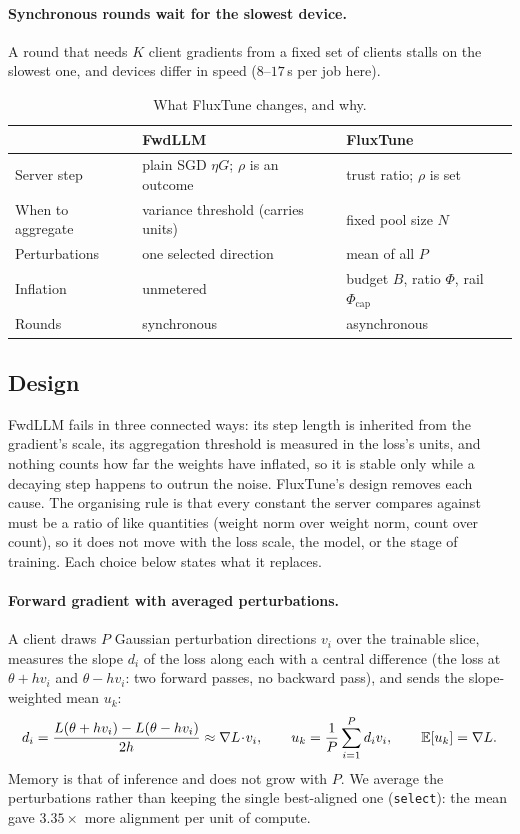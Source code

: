 \paragraph{Synchronous rounds wait for the slowest device.}
A round that needs $K$ client gradients from a fixed set of clients stalls on the slowest one, and devices differ in speed ($8$--$17$\,s per job here).

\begin{table}[t]
\centering
\caption{What FluxTune changes, and why.}
\label{tab:ft:changes}
\small
\begin{tabular}{@{}p{2.1cm}p{2.6cm}p{2.6cm}@{}}
\toprule
 & FwdLLM & FluxTune \\
\midrule
Server step & plain SGD $\eta G$; $\rho$ is an outcome & trust ratio; $\rho$ is set \\
When to aggregate & variance threshold (carries units) & fixed pool size $N$ \\
Perturbations & one selected direction & mean of all $P$ \\
Inflation & unmetered & budget $B$, ratio $\Phi$, rail $\Phi_{\mathrm{cap}}$ \\
Rounds & synchronous & asynchronous \\
\bottomrule
\end{tabular}
\end{table}

\subsection{Design}
\label{sec:ft:design}
FwdLLM fails in three connected ways: its step length is inherited from the gradient's scale, its aggregation threshold is measured in the loss's units, and nothing counts how far the weights have inflated,
so it is stable only while a decaying step happens to outrun the noise. FluxTune's design removes each cause. The organising rule is that every constant the server compares against must be a ratio of like quantities
(weight norm over weight norm, count over count), so it does not move with the loss scale, the model, or the stage of training. Each choice below states what it replaces.

\paragraph{Forward gradient with averaged perturbations.}\label{sec:ft:fg}
A client draws $P$ Gaussian perturbation directions $v_i$ over the trainable slice, measures the slope $d_i$ of the loss along each with a central difference (the loss at $\theta+hv_i$ and $\theta-hv_i$: two forward passes, no backward pass),
and sends the slope-weighted mean $u_k$:
\begin{equation}
d_i=\frac{L(\theta+hv_i)-L(\theta-hv_i)}{2h}\approx\nabla L\!\cdot\! v_i,\qquad
u_k=\frac1P\sum_{i=1}^{P}d_iv_i,\qquad\mathbb{E}[u_k]=\nabla L .
\label{eq:ft:fg}
\end{equation}
Memory is that of inference and does not grow with $P$. We average the perturbations rather than keeping the single best-aligned one (\texttt{select}): the mean gave $3.35\times$ more alignment per unit of compute.

